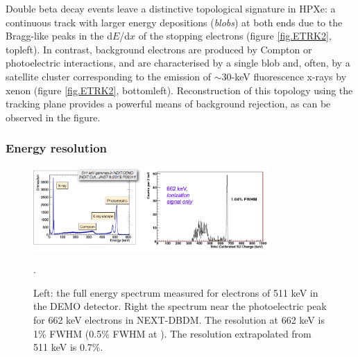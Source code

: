 Double beta decay events leave a distinctive topological signature in HPXe: a continuous track with larger energy depositions (\emph{blobs}) at both ends due to the Bragg-like peaks in the d$E$/d$x$ of the stopping electrons (figure \ref{fig.ETRK2}, topleft). In contrast, background electrons are produced by Compton or photoelectric interactions, and are characterised by a single blob and, often, by a satellite cluster corresponding to the emission of $\sim30$-keV fluorescence x-rays by xenon (figure \ref{fig.ETRK2}, bottomleft).
Reconstruction of this topology using the tracking plane provides a powerful means of background rejection, as can be observed in the figure. 

%

\subsubsection*{Energy resolution}

\begin{figure}
\centering
\includegraphics[width=0.8\textwidth]{img/EResolution.png}
\caption{\small Left: the full energy spectrum measured for electrons of 511 keV in the DEMO detector. Right the spectrum near the photoelectric peak for 662 keV electrons in NEXT-DBDM. The resolution at 662 keV is 1\% FWHM (0.5\% FWHM at \Qbb). The resolution extrapolated from 511 keV is 0.7\%.}\label{fig.ERES}. 
\end{figure}

